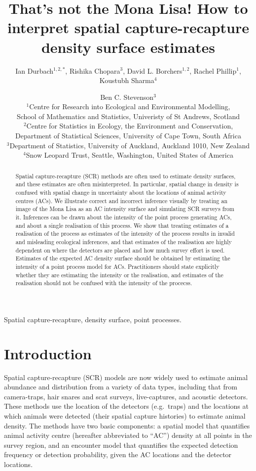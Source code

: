 \documentclass[useAMS,usenatbib,referee]{biom}
\title[How to interpret SCR density surface estimates]{That's not the Mona Lisa! How to interpret spatial capture-recapture density surface estimates}
\author{Ian Durbach$^{1,2,*}$, Rishika Chopara$^{3}$, David L. Borchers$^{1,2}$, Rachel Phillip$^{1}$, Koustubh Sharma$^{4}$ \and Ben C. Stevenson$^{3}$ \\
$^{1}$Centre for Research into Ecological and Environmental Modelling, \\ School of Mathematics and Statistics, Univeristy of St Andrews, Scotland \\
$^{2}$Centre for Statistics in Ecology, the Environment and Conservation, \\ Department of Statistical Sciences, University of Cape Town, South Africa \\
$^{3}$Department of Statistics, University of Auckland, Auckland 1010, New Zealand \\
$^{4}$Snow Leopard Trust, Seattle, Washington, United States of America \\
\email{indurbach@gmail.com}}
\begin{document}
\begin{abstract}
Spatial capture-recapture (SCR) methods are often used to estimate density surfaces, and these estimates are often misinterpreted. In particular, spatial change in density is confused with spatial change in uncertainty about the locations of animal activity centres (ACs). We illustrate correct and incorrect inference visually by treating an image of the Mona Lisa as an AC intensity surface and simulating SCR surveys from it. Inferences can be drawn about the intensity of the point process generating ACs, and about a single realisation of this process. We show that treating estimates of a realisation of the process as estimates of the intensity of the process results in invalid and misleading ecological inferences, and that estimates of the realisation are highly dependent on where the detectors are placed and how much survey effort is used. Estimates of the expected AC density surface should be obtained by estimating the intensity of a point process model for ACs. Practitioners should state explicitly whether they are estimating the intensity or the realisation, and estimates of the realisation should not be confused with the intensity of the procecss.
\end{abstract}

\begin{keywords}
Spatial capture-recapture, density surface, point processes.
\end{keywords}

\maketitle 

\section{Introduction}

Spatial capture-recapture (SCR) models \citep*{Efford:04,Borchers+Efford:08, Royle+Young:08} are now widely used to estimate animal abundance and distribution from a variety of data types, including that from camera-traps, hair snares and scat surveys, live-captures, and acoustic detectors. These methods use the location of the detectors (e.g.\ traps) and the locations at which animals were detected (their spatial capture histories) to estimate animal density. The methods have two basic components: a spatial model that quantifies animal activity centre (hereafter abbreviated to ``AC'') density at all points in the survey region, and an encounter model that quantifies the expected detection frequency or detection probability, given the AC locations and the detector locations. 
\end{document}
